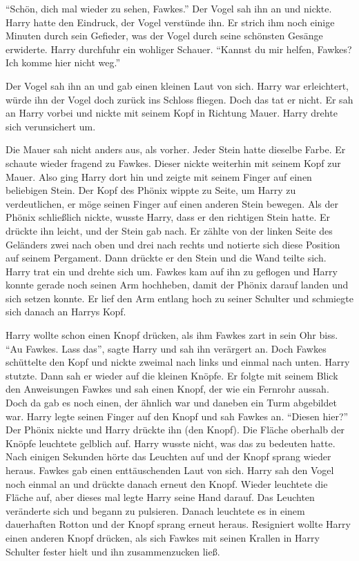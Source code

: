 \enquote{Schön, dich mal wieder zu sehen, Fawkes.} Der Vogel sah ihn an und nickte. Harry hatte den Eindruck, der Vogel verstünde ihn. Er strich ihm noch einige Minuten durch sein Gefieder, was der Vogel durch seine schönsten Gesänge erwiderte. Harry durchfuhr ein wohliger Schauer. \enquote{Kannst du mir helfen, Fawkes? Ich komme hier nicht weg.}

Der Vogel sah ihn an und gab einen kleinen Laut von sich. Harry war erleichtert, würde ihn der Vogel doch zurück ins Schloss fliegen. Doch das tat er nicht. Er sah an Harry vorbei und nickte mit seinem Kopf in Richtung Mauer. Harry drehte sich verunsichert um.

Die Mauer sah nicht anders aus, als vorher. Jeder Stein hatte dieselbe Farbe. Er schaute wieder fragend zu Fawkes. Dieser nickte weiterhin mit seinem Kopf zur Mauer. Also ging Harry dort hin und zeigte mit seinem Finger auf einen beliebigen Stein. Der Kopf des Phönix wippte zu Seite, um Harry zu verdeutlichen, er möge seinen Finger auf einen anderen Stein bewegen. Als der Phönix schließlich nickte, wusste Harry, dass er den richtigen Stein hatte. Er drückte ihn leicht, und der Stein gab nach. Er zählte von der linken Seite des Geländers zwei nach oben und drei nach rechts und notierte sich diese Position auf seinem Pergament. Dann drückte er den Stein und die Wand teilte sich. Harry trat ein und drehte sich um. Fawkes kam auf ihn zu geflogen und Harry konnte gerade noch seinen Arm hochheben, damit der Phönix darauf landen und sich setzen konnte. Er lief den Arm entlang hoch zu seiner Schulter und schmiegte sich danach an Harrys Kopf.

Harry wollte schon einen Knopf drücken, als ihm Fawkes zart in sein Ohr biss. \enquote{Au Fawkes. Lass das}, sagte Harry und sah ihn verärgert an. Doch Fawkes schüttelte den Kopf und nickte zweimal nach links und einmal nach unten. Harry stutzte. Dann sah er wieder auf die kleinen Knöpfe. Er folgte mit seinem Blick den Anweisungen Fawkes und sah einen Knopf, der wie ein Fernrohr aussah. Doch da gab es noch einen, der ähnlich war und daneben ein Turm abgebildet war. Harry legte seinen Finger auf den Knopf und sah Fawkes an. \enquote{Diesen hier?} Der Phönix nickte und Harry drückte ihn (den Knopf). Die Fläche oberhalb der Knöpfe leuchtete gelblich auf. Harry wusste nicht, was das zu bedeuten hatte. Nach einigen Sekunden hörte das Leuchten auf und der Knopf sprang wieder heraus. Fawkes gab einen enttäuschenden Laut von sich. Harry sah den Vogel noch einmal an und drückte danach erneut den Knopf. Wieder leuchtete die Fläche auf, aber dieses mal legte Harry seine Hand darauf. Das Leuchten veränderte sich und begann zu pulsieren. Danach leuchtete es in einem dauerhaften Rotton und der Knopf sprang erneut heraus. Resigniert wollte Harry einen anderen Knopf drücken, als sich Fawkes mit seinen Krallen in Harry Schulter fester hielt und ihn zusammenzucken ließ.

